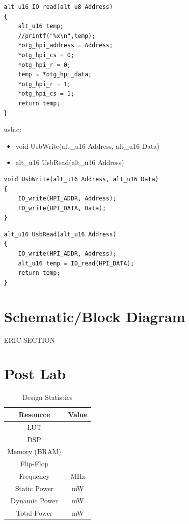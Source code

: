 \documentclass[journal, twocolumn, final,11pt,letterpaper]{IEEEtran}
\begin{document}
\begin{lstlisting}
alt_u16 IO_read(alt_u8 Address)
{
	alt_u16 temp;
	//printf("%x\n",temp);
	*otg_hpi_address = Address;
	*otg_hpi_cs = 0;
	*otg_hpi_r = 0;
	temp = *otg_hpi_data;
	*otg_hpi_r = 1;
	*otg_hpi_cs = 1;
	return temp;
}
\end{lstlisting}


usb.c:
\begin{itemize}
	\item 	void UsbWrite(alt\_u16 Address, alt\_u16 Data)
	\item 	alt\_u16 UsbRead(alt\_u16 Address)
\end{itemize}
\begin{lstlisting}
void UsbWrite(alt_u16 Address, alt_u16 Data)
{
	IO_write(HPI_ADDR, Address);
	IO_write(HPI_DATA, Data);
}
\end{lstlisting}


\begin{lstlisting}
alt_u16 UsbRead(alt_u16 Address)
{
	IO_write(HPI_ADDR, Address);
	alt_u16 temp = IO_read(HPI_DATA);
	return temp;
}
\end{lstlisting}



\section{Schematic/Block Diagram}
ERIC SECTION

\section{Post Lab}
\begin{table}[htbp]
	\centering
	\begin{tabular}{c|c}	%
		\toprule	%
		Resource & Value \\
		\midrule
		LUT & \\
		DSP & \\
		Memory (BRAM) & \\
		Flip-Flop & \\
		Frequency &   MHz\\
		Static Power & mW\\
		Dynamic Power &  mW\\
		Total Power & mW\\
		\bottomrule	%
	\end{tabular}%
	\caption{Design Statistics}
	\label{tab:design}
\end{table}
\end{document}
